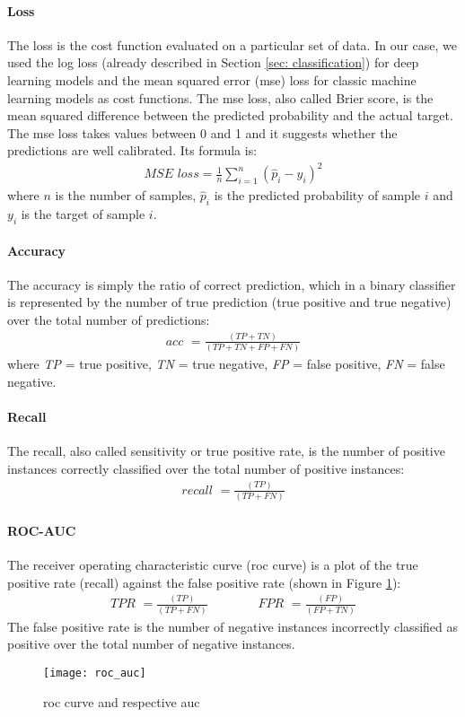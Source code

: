 \paragraph{Loss} The loss is the cost function evaluated on a particular set of data. In our case, we used the log loss (already described in Section \ref{sec: classification}) for deep learning models and the mean squared error (\acs{mse}) loss for classic machine learning models as cost functions. The \acs{mse} loss, also called Brier score, is the mean squared difference between the predicted probability and the actual target. The \acs{mse} loss takes values between 0 and 1 and it suggests whether the predictions are well calibrated. Its formula is:
\begin{align}
    \textit{MSE loss}=\frac{1}{n} \sum_{i=1}^{n}(\hat{p}_{i} - y_{i})^{2}
\end{align}
where $n$ is the number of samples, $\hat{p}_i$ is the predicted probability of sample $i$ and $y_i$ is the target of sample $i$.

\paragraph{Accuracy} The accuracy is simply the ratio of correct prediction, which in a binary classifier is represented by the number of true prediction (true positive and true negative) over the total number of predictions:
\begin{align}
    \textit{acc } = \frac{(TP + TN)}{(TP + TN + FP + FN)}
\end{align}
where \textit{TP} = true positive, \textit{TN} = true negative, \textit{FP} = false positive, \textit{FN} = false negative.

\paragraph{Recall} The recall, also called sensitivity or true positive rate, is the number of positive instances correctly classified over the total number of positive instances:
\begin{align}
    \textit{recall } = \frac{(TP)}{(TP + FN)}
\end{align}

\paragraph{ROC-AUC} The receiver operating characteristic curve (\acs{roc} curve) is a plot of the true positive rate (recall) against the false positive rate (shown in Figure \ref{fig:roc_auc}):
\begin{align}
    \textit{TPR } = \frac{(TP)}{(TP + FN)} \qquad\qquad \textit{FPR } = \frac{(FP)}{(FP + TN)}
\end{align}
The false positive rate is the number of negative instances incorrectly classified as positive over the total number of negative instances.
\begin{figure}[htbp]
    \centering
    \texttt{[image: roc\_auc]}
    \caption{\acs{roc} curve and respective \acs{auc}}
    \label{fig:roc_auc}
\end{figure}

